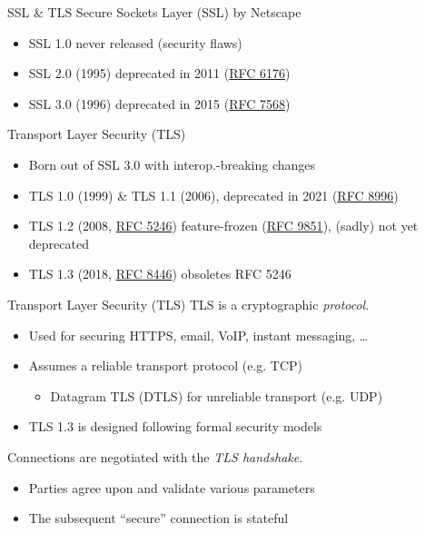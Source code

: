 \begin{frame}{SSL \& TLS}
  Secure Sockets Layer (SSL) by Netscape
  \begin{itemize}[<+(1)->]
    \item SSL 1.0 never released (security flaws)
    \item SSL 2.0 (1995) deprecated in 2011 (\href{https://datatracker.ietf.org/doc/html/rfc6176}{RFC 6176})
    \item SSL 3.0 (1996) deprecated in 2015 (\href{https://datatracker.ietf.org/doc/html/rfc7568}{RFC 7568}) 
  \end{itemize}

  \vspace*{1em}

  \pause
  Transport Layer Security (TLS)
  \begin{itemize}[<+(1)->]
    \item Born out of SSL 3.0 with interop.-breaking changes
    \item TLS 1.0 (1999) \& TLS 1.1 (2006), deprecated in 2021 (\href{https://datatracker.ietf.org/doc/html/rfc8996}{RFC 8996})
    \item TLS 1.2 (2008, \href{https://datatracker.ietf.org/doc/html/rfc5246}{RFC 5246}) feature-frozen (\href{https://datatracker.ietf.org/doc/html/rfc9851}{RFC 9851}), (sadly) not yet deprecated
    \item TLS 1.3 (2018, \href{https://datatracker.ietf.org/doc/html/rfc8446}{RFC 8446}) obsoletes RFC 5246
  \end{itemize}
\end{frame}

\begin{frame}{Transport Layer Security (TLS)}
  TLS is a cryptographic \emph{protocol}.
  \begin{itemize}[<+(1)->]
    \item Used for securing HTTPS, email, VoIP, instant messaging, \dots
    \item Assumes a reliable transport protocol (e.g. TCP)
    \par
    \begin{itemize}
      \item Datagram TLS (DTLS) for unreliable transport (e.g. UDP)
    \end{itemize}
    \item TLS 1.3 is designed following formal security models
  \end{itemize}

  \vspace*{1em}

  \pause
  Connections are negotiated with the \emph{TLS handshake}.
  \begin{itemize}[<+(1)->]
    \item Parties agree upon and validate various parameters
    \item The subsequent \enquote{secure} connection is stateful
  \end{itemize}
\end{frame}

